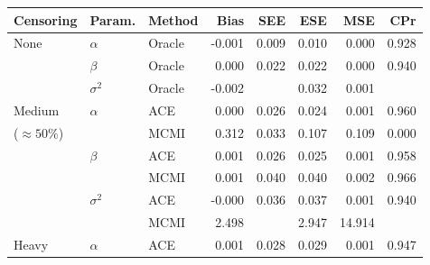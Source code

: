 \documentclass[12pt]{article}
\begin{document}
\begin{table}[!ht]
\centering
\begin{tabular}{lllrrrrr}
  \hline
Censoring & Param. & Method & Bias & SEE & ESE & MSE & CPr \\ 
  \hline
   
   None & $\alpha$ & Oracle & -0.001 & 0.009 & 0.010 & 0.000 & 0.928 \\
   & $\beta$ & Oracle & 0.000 & 0.022 & 0.022 & 0.000 & 0.940 \\ 
   & $\sigma^2$ & Oracle & -0.002 &  & 0.032 & 0.001 &  \\ 
  Medium & $\alpha$ & ACE & 0.000 & 0.026 & 0.024 & 0.001 & 0.960 \\ 
  ($\approx 50\%$) %
   &  & MCMI & 0.312 & 0.033 & 0.107 & 0.109 & 0.000 \\
   & $\beta$ & ACE & 0.001 & 0.026 & 0.025 & 0.001 & 0.958 \\ 
   &  & MCMI & 0.001 & 0.040 & 0.040 & 0.002 & 0.966 \\
   & $\sigma^2$ & ACE & -0.000 & 0.036 & 0.037 & 0.001 & 0.940 \\ 
   &  & MCMI & 2.498 &  & 2.947 & 14.914 &  \\
  Heavy & $\alpha$ & ACE & 0.001 & 0.028 & 0.029 & 0.001 & 0.947 \\ 

\end{tabular}
\end{table}
\end{document}
